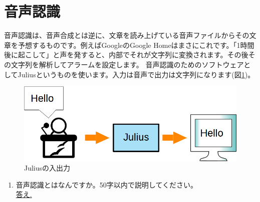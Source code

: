 \section{音声認識}
音声認識は、音声合成とは逆に、文章を読み上げている音声ファイルからその文章を予想するものです。例えばGoogleのGoogle Homeはまさにこれです。「1時間後に起こして」と声を発すると、内部でそれが文字列に変換されます。その後その文字列を解析してアラームを設定します。
音声認識のためのソフトウェアとしてJuliusというものを使います。入力は音声で出力は文字列になります(図\ref{Juliusの入出力})。

\begin{figure}[H]
\begin{center}
    \includegraphics[width=\linewidth]{images/chap06/text06-img002.png}
    \caption{Juliusの入出力}
    \label{Juliusの入出力}
\end{center}
\end{figure}

\begin{tcolorbox}[title=\useOmetoi]
\begin{enumerate}
\item 音声認識とはなんですか。50字以内で説明してください。\\
\underline{答え.\hspace{0.8\linewidth}}
\end{enumerate}
\end{tcolorbox}
